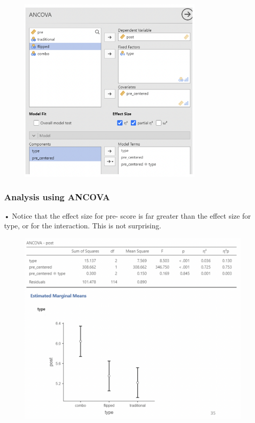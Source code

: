 \documentclass[
  letterpaper,
  DIV=11,
  numbers=noendperiod]{scrreprt}
\begin{document}
\begin{figure}

{\centering \includegraphics[width=3.46875in,height=\textheight]{images/Mod5_21.png}

}

\end{figure}

\hypertarget{analysis-using-ancova}{%
\subsubsection{Analysis using ANCOVA}\label{analysis-using-ancova}}

• Notice that the effect size for pre- score is far greater than the
effect size for type, or for the interaction. This is not surprising.

\begin{figure}

{\centering \includegraphics[width=6.52083in,height=\textheight]{images/Mod5_22.png}

}

\end{figure}
\end{document}
